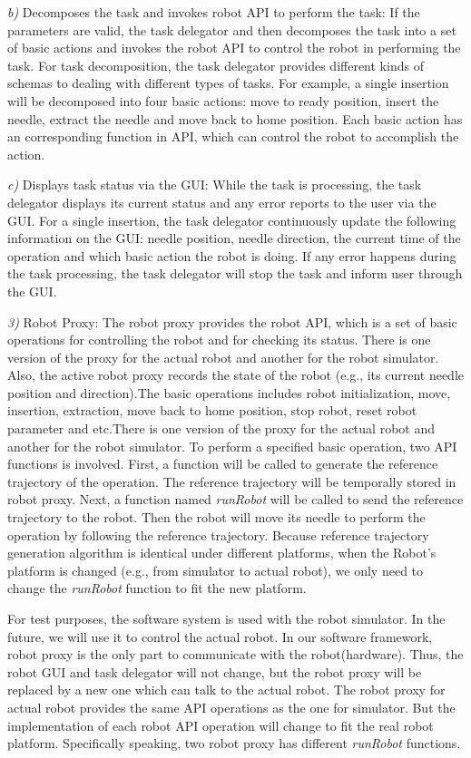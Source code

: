 \emph{b)}	Decomposes the task and invokes robot API to perform the task:  If the parameters are valid, the task delegator and then decomposes the task into a set of basic actions and invokes the robot API to control the robot in performing the task. For task decomposition, the task delegator provides different kinds of schemas to dealing with different types of tasks. For example, a single insertion will be decomposed into four basic actions: move to ready position, insert the needle, extract the needle and move back to home position. Each basic action has an corresponding function in API, which can control the robot to accomplish the action.

\emph{c)}	Displays task status via the GUI: While the task is processing, the task delegator displays its current status and any error reports to the user via the GUI. For a single insertion, the task delegator continuously update the following information on the GUI: needle position, needle direction, the current time of the operation and which basic action the robot is doing. If any error happens during the task processing, the task delegator will stop the task and inform user through the GUI.

\emph{3)}	Robot Proxy: The robot proxy provides the robot API, which is a set of basic operations for controlling the robot and for checking its status. There is one version of the proxy for the actual robot and another for the robot simulator. Also, the active robot proxy records the state of the robot (e.g., its current needle position and direction).The basic operations includes robot initialization, move, insertion, extraction, move back to home position, stop robot,  reset robot parameter and etc.There is one version of the proxy for the actual robot and another for the robot simulator. To perform a specified basic operation, two API functions is involved. First, a function will be called to generate the reference trajectory of the operation. The reference trajectory will be temporally stored in robot proxy. Next, a function named \emph{runRobot} will be called to send the reference trajectory to the robot. Then the robot will move its needle to perform the operation by following the reference trajectory. Because reference trajectory generation algorithm is identical under different platforms, when the Robot’s platform is changed (e.g., from simulator to actual robot), we only need to change the \emph{runRobot} function to fit the new platform.

For test purposes, the software system is used with the robot simulator. In the future, we will use it to control the actual robot. In our software framework, robot proxy is the only part to communicate with the robot(hardware). Thus, the robot GUI and task delegator will not change, but the robot proxy will be replaced by a new one which can talk to the actual robot. The robot proxy for actual robot provides the same API operations as the one for simulator. But the implementation of each robot API operation will change to fit the real robot platform. Specifically speaking, two robot proxy has different \emph{runRobot} functions.

